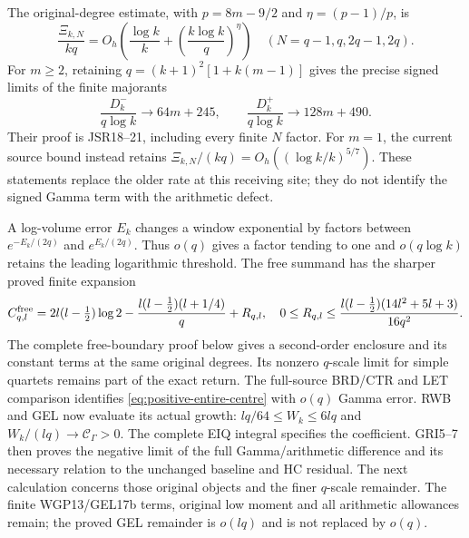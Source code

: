 \documentclass[11pt,a4paper]{article}
\begin{document}
The original-degree estimate, with $p=8m-9/2$ and
$\eta=(p-1)/p$, is
\begin{equation}
 \frac{\Xi_{k,N}}{kq}
 =O_h\!\left(\frac{\log k}{k}
                  +\left(\frac{k\log k}{q}\right)^\eta\right)
 \quad(N=q-1,q,2q-1,2q).
\end{equation}
For $m\ge2$, retaining $q=(k+1)^2[1+k(m-1)]$ gives the precise
signed limits of the finite majorants
\begin{equation}
 \frac{D_k^-}{q\log k}\longrightarrow64m+245,
 \qquad \frac{D_k^+}{q\log k}\longrightarrow128m+490.
\end{equation}
Their proof is JSR18--21, including every finite $N$ factor.
For $m=1$, the current source bound instead retains
$\Xi_{k,N}/(kq)=O_h((\log k/k)^{5/7})$.
These statements replace the older rate at this receiving site;
they do not identify the signed Gamma term with the arithmetic defect.

A log-volume error $E_k$ changes a window exponential by factors
between $e^{-E_k/(2q)}$ and $e^{E_k/(2q)}$. Thus $o(q)$ gives a
factor tending to one and $o(q\log k)$ retains the leading logarithmic
threshold. The free summand has the sharper proved finite expansion
\begin{equation}
 C_{q,l}^{\rm free}=2l(l-\tfrac12)\log2
 -\frac{l(l-\tfrac12)(l+1/4)}q+R_{q,l},\quad
 0\le R_{q,l}\le\frac{l(l-\tfrac12)(14l^2+5l+3)}{16q^2}.
\end{equation}
The complete free-boundary proof below gives a second-order enclosure
and its constant terms at the same original degrees. Its nonzero
$q$-scale limit for simple quartets remains part of the exact return.
The full-source BRD/CTR and LET comparison identifies
\eqref{eq:positive-entire-centre} with $o(q)$ Gamma error.
RWB and GEL now evaluate its actual growth:
$lq/64\leq W_k\leq6lq$ and $W_k/(lq)\to\mathcal C_\Gamma>0$.
The complete EIQ integral specifies the coefficient. GRI5--7
then proves the negative limit of the full Gamma/arithmetic
difference and its necessary relation to the unchanged baseline
and HC residual. The next calculation concerns those original
objects and the finer $q$-scale remainder. The finite WGP13/GEL17b
terms, original low moment and all arithmetic allowances remain;
the proved GEL remainder is $o(lq)$ and is not replaced by $o(q)$.
\end{document}
